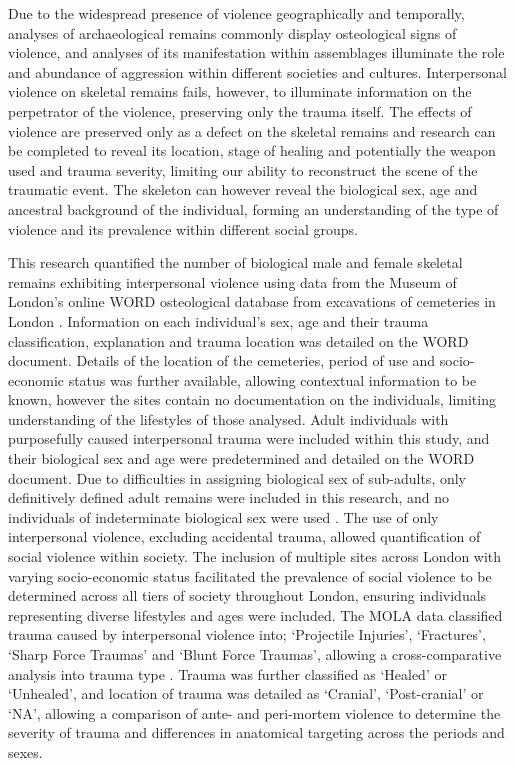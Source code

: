 Due to the widespread presence of violence geographically and temporally, analyses of archaeological remains commonly display osteological signs of violence, and analyses of its manifestation within assemblages illuminate the role and abundance of aggression within different societies and cultures. Interpersonal violence on skeletal remains fails, however, to illuminate information on the perpetrator of the violence, preserving only the trauma itself.  The effects of violence are preserved only as a defect on the skeletal remains and research can be completed to reveal its location, stage of healing and potentially the weapon used and trauma severity, limiting our ability to reconstruct the scene of the traumatic event. The skeleton can however reveal the biological sex, age and ancestral background of the individual, forming an understanding of the type of violence and its prevalence within different social groups. 

%
This research quantified the number of biological male and female skeletal remains exhibiting interpersonal violence using data from the Museum of London’s online WORD osteological database from excavations of cemeteries in London \parencites{museumoflondoncentreforbioarchaeologymedieval}{museumoflondoncentreforbioarchaeologypostmedieval}. 
 Information on each individual’s sex, age and their trauma classification, explanation and trauma location was detailed on the WORD document.  Details of the location of the cemeteries, period of use and socio-economic status was further available, allowing contextual information to be known, however the sites contain no documentation on the individuals, limiting understanding of the lifestyles of those analysed.  
Adult individuals with purposefully caused interpersonal trauma were included within this study, and their biological sex and age were predetermined and detailed on the WORD document. Due to difficulties in assigning biological sex of sub-adults, only definitively defined adult remains were included in this research, and no individuals of indeterminate biological sex were used \parencites{museumoflondoncentreforbioarchaeologymedieval}{museumoflondoncentreforbioarchaeologypostmedieval}.  The use of only interpersonal violence, excluding accidental trauma, allowed quantification of social violence within society.  The inclusion of multiple sites across London with varying socio-economic status facilitated the prevalence of social violence to be determined across all tiers of society throughout London, ensuring individuals representing diverse lifestyles and ages were included. The MOLA data classified trauma caused by interpersonal violence into; ‘Projectile Injuries’, ‘Fractures’, ‘Sharp Force Traumas’ and ‘Blunt Force Traumas’, allowing a cross-comparative analysis into trauma type \parencites{museumoflondoncentreforbioarchaeologymedieval}{museumoflondoncentreforbioarchaeologypostmedieval}.  Trauma was further classified as ‘Healed’ or ‘Unhealed’, and location of trauma was detailed as ‘Cranial’, ‘Post-cranial’ or ‘NA’, allowing a comparison of ante- and peri-mortem violence to determine the severity of trauma and differences in anatomical targeting across the periods and sexes.  

